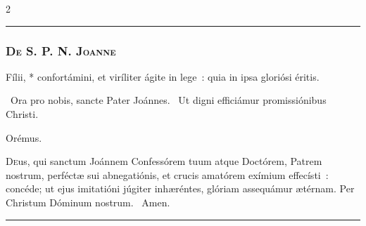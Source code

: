\documentclass[9pt,twoside]{extarticle}
\begin{document}
\begin{multicols}{2}
\begin{center}\textcolor{red}{\rule{\linewidth}{0.5pt}} \end{center}

\subsubsection*{\center \textsc{De S. P. N. Joanne}}
\begin{tightlist}{}
\item {} Fílii, * confortámini, et viríliter ágite in lege~: quia in ipsa gloriósi éritis.
\item {}~Ora pro nobis, sancte Pater Joánnes. ~Ut digni efficiámur promissiónibus Christi.
\item Orémus. \hfill {}
\end{tightlist}
\lettrine{D}eus, qui sanctum Joánnem Confessórem tuum atque Doctórem, Patrem nostrum, perféctæ sui abnegatiónis, et crucis amatórem exímium effecísti~: concéde; ut ejus imitatióni júgiter inhæréntes, glóriam assequámur ætérnam. Per Christum Dóminum nostrum. ~Amen.

\begin{center}\textcolor{red}{\rule{\linewidth}{0.5pt}} \end{center}
\end{multicols}
\end{document}
